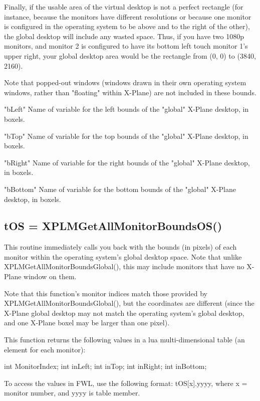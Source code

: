 \documentclass[11pt,parskip=half,a4paper]{scrartcl}
\begin{document}
Finally, if the usable area of the virtual desktop is not a perfect rectangle (for instance, because the monitors have different resolutions or because one monitor is configured in the operating system to be above and to the right of the other), the global desktop will include any wasted space. Thus, if you have two 1080p monitors, and monitor 2 is configured to have its bottom left touch monitor 1's upper right, your global desktop area would be the rectangle from (0, 0) to (3840, 2160).

Note that popped-out windows (windows drawn in their own operating system windows, rather than "floating" within X-Plane) are not included in these bounds.

"bLeft" Name of variable for the left bounds of the "global" X-Plane desktop, in boxels.

"bTop" Name of variable for the top bounds of the "global" X-Plane desktop, in boxels.

"bRight" Name of variable for the right bounds of the "global" X-Plane desktop, in boxels.

"bBottom" Name of variable for the bottom bounds of the "global" X-Plane desktop, in boxels.

\newpage

\subsection{\hspace*{1.0mm}tOS = XPLMGetAllMonitorBoundsOS()}

This routine immediately calls you back with the bounds (in pixels) of each monitor within the operating system's global desktop space. Note that unlike XPLMGetAllMonitorBoundsGlobal(), this may include monitors that have no X-Plane window on them.

Note that this function's monitor indices match those provided by XPLMGetAllMonitorBoundsGlobal(), but the coordinates are different (since the X-Plane global desktop may not match the operating system's global desktop, and one X-Plane boxel may be larger than one pixel).

This function returns the following values in a lua multi-dimensional table (an element for each monitor):

    int        MonitorIndex;
    int        inLeft;
    int        inTop;
    int        inRight;
    int        inBottom;
 

To access the values in FWL, use the following format: tOS[x].yyyy, where x = monitor number, and yyyy is table member.
\end{document}
